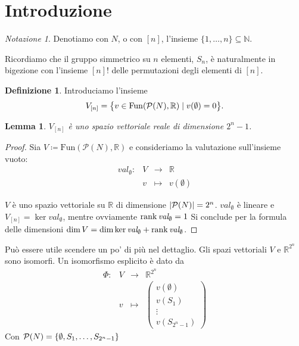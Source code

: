 \documentclass[a4paper,11pt]{article}
\theoremstyle{definition}				%
\newtheorem{definizione}{Definizione}%
\theoremstyle{remark}
\newtheorem*{notazione}{Notazione}
\theoremstyle{plain}
\newtheorem{lemma}{Lemma}%
\newcommand{\R}{\mathbb{R}}										%
\begin{document}
	\begin{abstract}
		Template standard per un documento in \LaTeX{} 
	\end{abstract}
	
	\section*{Introduzione}
	\begin{notazione}
		Denotiamo con $N$, o con $[n]$, l'insieme $\{1,\dots,n\}\subseteq\mathbb{N}$.
		
		Ricordiamo che il gruppo simmetrico su $n$ elementi, $S_n$, è naturalmente in bigezione con l'insieme $[n]!$ delle permutazioni degli elementi di $[n]$.
	\end{notazione}
	
	\begin{definizione}
		Introduciamo l'insieme 
		\[
			V_{[n]}=\qty\big{v\in\mathrm{Fun}\qty(\mathcal{P}(N),\R)\mid v(\emptyset)=0}.
		\]
	\end{definizione}
	
	\begin{lemma}\label{lemma:vectorspace}
		$V_{[n]}$ è uno spazio vettoriale reale di dimensione $2^n-1$.
	\end{lemma}
	\begin{proof}
		Sia $V\coloneqq\mathrm{Fun}\left(\mathcal{P}(N),\R\right)$ e consideriamo la valutazione sull'insieme vuoto: 
		\[
			\begin{array}{rccl}
				\mathit{val}_{\emptyset}\colon	& V	& \longrightarrow & \R\\
				 & v & \longmapsto & v\left(\emptyset\right)
			\end{array}	
		\]
		
		$V$ è uno spazio vettoriale su $\R$ di dimensione $\qty|\mathcal{P}(N)|=2^n$. $\mathit{val}_{\emptyset}$ è lineare e $V_{[n]}=\ker\textit{val}_{\emptyset}$, mentre ovviamente $\rank \textit{val}_{\emptyset}=1$ Si conclude per la formula delle dimensioni $\dim V = \dim\ker\textit{val}_{\emptyset}+\rank\textit{val}_{\emptyset}$.
	\end{proof}
	
	Può essere utile scendere un po' di più nel dettaglio. Gli spazi vettoriali $V$ e $\R^{2^n}$ sono isomorfi. Un isomorfismo esplicito è dato da
	\[
		\begin{array}{rccc}
			\Phi\colon & V & \longrightarrow & \R^{2^n}\\
			 & v & \longmapsto & \begin{pmatrix}
			 v(\emptyset)\\
			 v(S_1)\\
			 \vdots\\
			 v(S_{2^n-1})
			 \end{pmatrix}
		\end{array}
	\]
	Con $\mathcal{P}(N)=\qty{\emptyset,S_1,\dots,S_{2^n-1}}$
	
\end{document}
